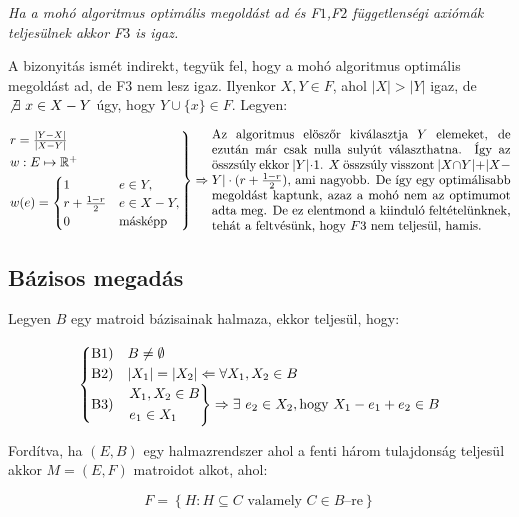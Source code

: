 \vspace{0.4cm}
\emph{Ha a mohó algoritmus optimális megoldást ad és F$1$,F$2$ függetlenségi axiómák
teljesülnek akkor F$3$ is igaz.}
\vspace{0.4cm}

A bizonyitás ismét indirekt, tegyük fel, hogy a mohó algoritmus optimális megoldást ad, de
F$3$ nem lesz igaz. Ilyenkor $X,Y \in F$, ahol $|X|>|Y|$ igaz, de $\not \exists~x \in X-Y$ úgy, hogy
$Y \cup \{x\} \in F$. Legyen:

\[
\begin{rcases}
r=\frac{|Y-X|}{|X-Y|}\\
w : E \mapsto \mathbb{R}^+ \\
w(e) = \begin{cases}
1 & e \in Y, \\
r + \frac{1-r}{2} & e \in X-Y, \\
0 & \mbox{másképp}
\end{cases}
\end{rcases}\Rightarrow
\parbox[L]{8.25cm}{
Az algoritmus elöszőr kiválasztja $Y$ elemeket, de ezután már csak nulla sulyút
választhatna. Így az összsúly ekkor $|Y|\cdot 1$. $X$ összsúly visszont $|X \cap
Y| + |X-Y|\cdot(r+\frac{1-r}{2})$, ami nagyobb. De így egy optimálisabb megoldást
kaptunk, azaz a mohó nem az optimumot adta meg. De ez elentmond a kiinduló feltételünknek,
tehát a feltvésünk, hogy $F$3 nem teljesül, hamis. } \]

\subsection{Bázisos megadás}
Legyen $B$ egy matroid bázisainak halmaza, ekkor teljesül, hogy:

\[
\begin{cases}
\mbox{B1)} & B \neq \emptyset \\
\mbox{B2)} & |X_1|=|X_2| \Leftarrow \forall X_1,X_2 \in B\\
\mbox{B3)} & \begin{rcases}
X_1, X_2 \in B \\
e_1 \in X_1
\end{rcases}\Rightarrow \exists~e_2 \in X_2, \mbox{hogy } X_1-e_1+e_2 \in B \\
\end{cases}
\]

Fordítva, ha $(E,B)$ egy halmazrendszer ahol a fenti három tulajdonság teljesül akkor $M=(E,F)$
matroidot alkot, ahol:

\[
F = \left\{H: H \subseteq C \mbox{ valamely } C \in B\mbox{--re}\right\}
\]


